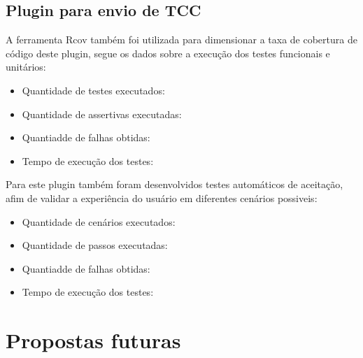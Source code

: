 \subsection{Plugin para envio de TCC}

A ferramenta Rcov também foi utilizada para dimensionar a taxa de cobertura de código deste plugin, segue os dados sobre a execução dos testes funcionais e unitários:

\begin{itemize}
\item Quantidade de testes executados: 
\item Quantidade de assertivas executadas: 
\item Quantiadde de falhas obtidas: 
\item Tempo de execução dos testes: 
\end{itemize}

Para este plugin também foram desenvolvidos testes automáticos de aceitação, afim de validar a experiência do usuário em diferentes cenários possiveis:
\begin{itemize}
\item Quantidade de cenários executados: 
\item Quantidade de passos executadas: 
\item Quantiadde de falhas obtidas: 
\item Tempo de execução dos testes: 
\end{itemize}
\section{Propostas futuras}
